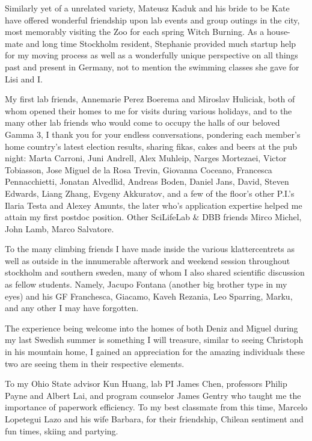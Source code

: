 Similarly yet of a unrelated variety, Mateusz Kaduk and his bride to be Kate have offered wonderful friendship upon lab events and group outings in the city, most memorably visiting the Zoo for each spring Witch Burning. As a house-mate and long time Stockholm resident, Stephanie provided much startup help for my moving process as well as a wonderfully unique perspective on all things past and present in Germany, not to mention the swimming classes she gave for Lisi and I.

My first lab friends, Annemarie Perez Boerema and Miroslav Huliciak, both of whom opened their homes to me for visits during various holidays, and to the many other lab friends who would come to occupy the halls of our beloved Gamma 3, I thank you for your endless conversations, pondering each member's home country's latest election results, sharing fikas, cakes and beers at the pub night: Marta Carroni, Juni Andrell, Alex Muhleip, Narges Mortezaei, Victor Tobiasson, Jose Miguel de la Rosa Trevin, Giovanna Coceano, Francesca Pennacchietti, Jonatan Alvedlid, Andreas Boden, Daniel Jans, David, Steven Edwards, Liang Zhang, Evgeny Akkuratov, and a few of the floor's other P.I.'s Ilaria Testa and Alexey Amunts, the later who's application expertise helped me attain my first postdoc position. Other SciLifeLab \& DBB friends Mirco Michel, John Lamb, Marco Salvatore.

To the many climbing friends I have made inside the various klattercentrets as well as outside in the innumerable afterwork and weekend session throughout stockholm and southern sweden, many of whom I also shared scientific discussion as fellow students. Namely, Jacupo Fontana (another big brother type in my eyes) and his GF Franchesca, Giacamo, Kaveh Rezania, Leo Sparring, Marku, and any other I may have forgotten.

The experience being welcome into the homes of both Deniz and Miguel during my last Swedish summer is something I will treasure, similar to seeing Christoph in his mountain home, I gained an appreciation for the amazing individuals these two are seeing them in their respective elements.

To my Ohio State advisor Kun Huang, lab PI James Chen, professors Philip Payne and Albert Lai, and program counselor James Gentry who taught me the importance of paperwork efficiency. To my best classmate from this time, Marcelo Lopetegui Lazo and his wife Barbara, for their friendship, Chilean sentiment and fun times, skiing and partying.

